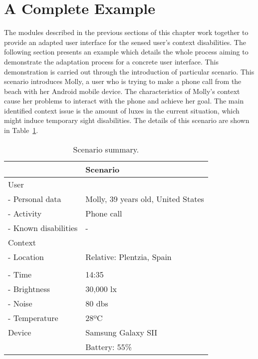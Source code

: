 \section{A Complete Example}
\label{sec:complete_example}

The modules described in the previous sections of this chapter work together to
provide an adapted user interface for the sensed user's context disabilities. 
The following section presents an example which details the whole process aiming
to demonstrate the adaptation process for a concrete user interface. This 
demonstration is carried out through the introduction of particular scenario. 
This scenario introduces Molly, a user who is trying to make a phone call from 
the beach with her Android mobile device. The characteristics of Molly's context 
cause her problems to interact with the phone and achieve her goal. The main 
identified context issue is the amount of luxes in the current situation, which 
might induce temporary sight disabilities. The details of this scenario are shown
in Table~\ref{tbl:example_scenario}.

\begin{table}[H]
 \caption{Scenario summary.}
 \label{tbl:example_scenario}
 \footnotesize
 \centering
\begin{tabular}{l l}
  \hline 
				& \textbf{Scenario}	\\
  \hline
  User \\
  \qquad - Personal data 	& Molly, 39 years old, United States\\
  \qquad - Activity	 	& Phone call		\\
  \qquad - Known disabilities 	& - 			\\
  Context \\
  \qquad - Location 		& Relative: Plentzia, Spain\\
				& 			\\
  \qquad - Time			& 14:35 		\\
  \qquad - Brightness		& 30,000 \ac{lx}	\\
  \qquad - Noise		& 80 \acp{db}		\\
  \qquad - Temperature		& 28ºC 			\\
  Device 			& Samsung Galaxy SII 	\\
				& Battery: 55\%	\\
  \hline
\end{tabular}
\end{table}

